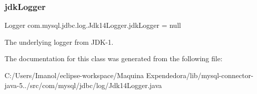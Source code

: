 \subsubsection{\texorpdfstring{jdk\+Logger}{jdkLogger}}
{\footnotesize\ttfamily Logger com.\+mysql.\+jdbc.\+log.\+Jdk14\+Logger.\+jdk\+Logger = null\hspace{0.3cm}{\ttfamily [protected]}}

The underlying logger from J\+D\+K-\/1. 

The documentation for this class was generated from the following file\+:\begin{DoxyCompactItemize}
\item 
C\+:/\+Users/\+Imanol/eclipse-\/workspace/\+Maquina Expendedora/lib/mysql-\/connector-\/java-\/5../src/com/mysql/jdbc/log/Jdk14\+Logger.\+java\end{DoxyCompactItemize}
